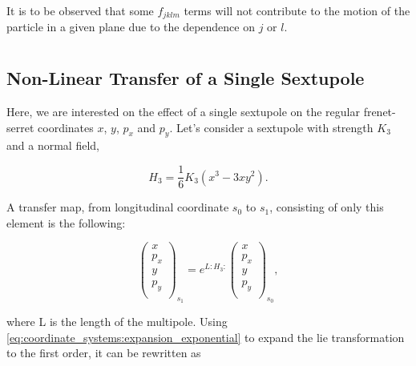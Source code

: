 It is to be observed that some $f_{jklm}$ terms will not contribute to the motion of the particle 
in a given plane due to the dependence on $j$ or $l$.



\section{}


\subsection{Non-Linear Transfer of a Single Sextupole}

Here, we are interested on the effect of a single sextupole on the regular frenet-serret coordinates
$x$, $y$, $p_x$ and $p_y$.
Let's consider a sextupole with strength $K_3$ and a normal field,

\begin{equation}
    H_3 = \frac{1}{6} K_3 (x^3 - 3xy^2).
\end{equation}

A transfer map, from longitudinal coordinate $s_0$ to $s_1$, consisting of only this element is the
following:

\begin{equation}
    \begin{pmatrix}
        x \\
        p_x \\
        y \\
        p_y \\
    \end{pmatrix}_{s_1}
    =
    e^{L:H_3:}
    \begin{pmatrix}
        x \\
        p_x \\
        y \\
        p_y \\
    \end{pmatrix}_{s_0},
    \label{eq:coordinate_systems:single_sextupole_lie_transfer}
\end{equation}

where L is the length of the multipole. 
Using \cref{eq:coordinate_systems:expansion_exponential} to expand the lie transformation to the
first order, it can be rewritten as

